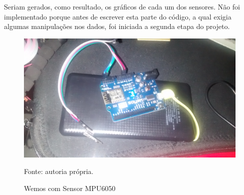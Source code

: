 	Seriam gerados, como resultado, os gráficos de cada um dos sensores. Não foi implementado porque antes de escrever esta parte do código, a qual exigia algumas manipulações nos dados, foi iniciada a segunda etapa do projeto. 
	
	\begin{figure}[h]
		\centering
		\includegraphics[keepaspectratio=true,scale=0.075]{figuras/wemos1.jpg}
		\caption{Wemos com Sensor MPU6050}
		\footnotesize Fonte: autoria própria. 
		\label{wemos1}	
	\end{figure}
	
